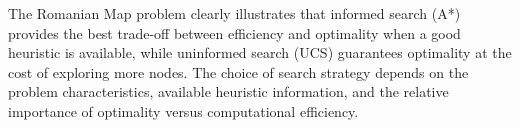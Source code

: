 \documentclass[12pt,a4paper]{article}
\begin{document}
The Romanian Map problem clearly illustrates that informed search (A*) provides the best trade-off between efficiency and optimality when a good heuristic is available, while uninformed search (UCS) guarantees optimality at the cost of exploring more nodes. The choice of search strategy depends on the problem characteristics, available heuristic information, and the relative importance of optimality versus computational efficiency.
\end{document}
